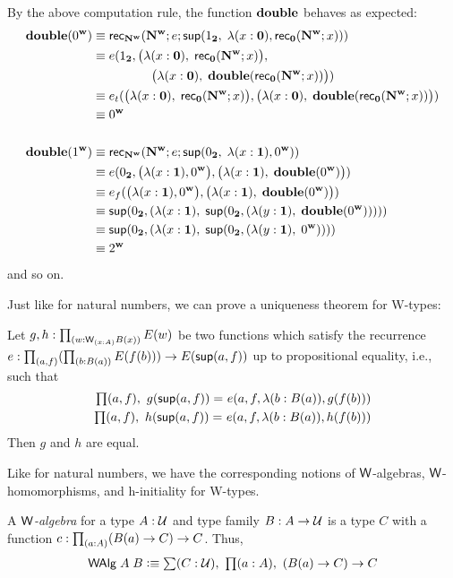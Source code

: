 By the above computation rule, the function $\mathbf{double}$ behaves as expected:
\begin{align*}
\mathbf{double}(0^\mathbf{w}) & \equiv \mathsf{rec}_{\mathbf{N^w}}(\mathbf{N^w}; e; \mathsf{sup}(1_{\mathbf{2}}, \; \lambda(x : \mathbf{0}), \mathsf{rec}_{\mathbf{0}}(\mathbf{N^w};x))) \\
& \equiv e(1_{\mathbf{2}}, \big(\lambda(x : \mathbf{0}), \; \mathsf{rec}_{\mathbf{0}}(\mathbf{N^w};x)\big), \\
 & \;\;\;\;\;\;\;\;\;\;\;\;\;\;\;\;\; \big(\lambda(x : \mathbf{0}), \; \mathbf{double}(\mathsf{rec}_{\mathbf{0}}(\mathbf{N^w};x))\big)) \\
 & \equiv e_t(\big(\lambda(x : \mathbf{0}), \; \mathsf{rec}_{\mathbf{0}}(\mathbf{N^w};x)\big), \big(\lambda(x : \mathbf{0}), \; \mathbf{double}(\mathsf{rec}_{\mathbf{0}}(\mathbf{N^w};x))\big)) \\
 & \equiv 0^\mathbf{w} \\
 \\
\mathbf{double}(1^\mathbf{w}) & \equiv \mathsf{rec}_{\mathbf{N^w}}(\mathbf{N^w}; e; \mathsf{sup}(0_{\mathbf{2}}, \; \lambda(x : \mathbf{1}), 0^\mathbf{w})) \\
& \equiv e(0_{\mathbf{2}}, \big(\lambda(x : \mathbf{1}), 0^\mathbf{w}\big), \big(\lambda(x : \mathbf{1}), \; \mathbf{double}(0^\mathbf{w})\big)) \\
 & \equiv e_f(\big(\lambda(x : \mathbf{1}), 0^\mathbf{w}\big), \big(\lambda(x : \mathbf{1}), \; \mathbf{double}(0^\mathbf{w})\big)) \\
 & \equiv \mathsf{sup}(0_{\mathbf{2}}, (\lambda (x:\mathbf{1}), \; \mathsf{sup}(0_{\mathbf{2}},(\lambda (y : \mathbf{1}), \; \mathbf{double}(0^\mathbf{w}))))) \\
 & \equiv \mathsf{sup}(0_{\mathbf{2}}, (\lambda (x:\mathbf{1}), \; \mathsf{sup}(0_{\mathbf{2}},(\lambda (y : \mathbf{1}), \; 0^\mathbf{w})))) \\
 & \equiv 2^\mathbf{w}
\end{align*}
and so on.

\medskip

Just like for natural numbers, we can prove a uniqueness theorem for 
W-types:
\begin{thm}\label{thm:w-uniq}
Let $g,h : \prd{w:\wtype{x:A}B(x)} E(w)$ be two functions which satisfy the recurrence $e : \prd{a,f} (\prd{b : B(a)} E(f(b))) \to E(\supp(a,f))$ up to propositional equality, i.e., such that
\begin{align*}
\prd{a,f} \id{g(\supp(a,f))}{e(a,f,\lambda (b: B(a)), g(f(b)))} \\
\prd{a,f} \id{h(\supp(a,f))}{e(a,f,\lambda (b: B(a)), h(f(b)))}
\end{align*}
Then $g$ and $h$ are equal. 
\end{thm}

Like for natural numbers, we have the corresponding notions of $\mathsf{W}$-algebras, $\mathsf{W}$-homomorphisms, and h-initiality for W-types.
\begin{defn}
A \emph{$\mathsf{W}$-algebra} for a type $A : \mathcal{U}$ and type family $B : A \to \mathcal{U}$ is a type $C$ with a function $c : \prd{a:A} (B(a) \to C) \to C$. Thus,
\begin{align*}
\walg \; A \; B \defeq \sm {C : \type} \prd{a:A} (B(a) \to C) \to C
\end{align*}
\end{defn}

